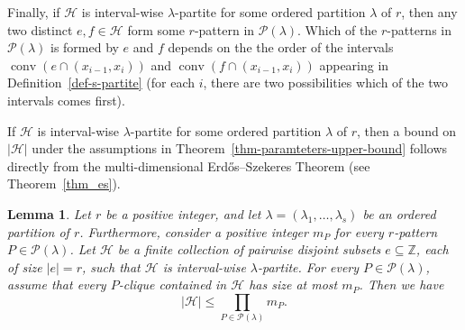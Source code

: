 \documentclass{aic}
\newtheorem{lemma}[theorem]{Lemma}
\theoremstyle{definition}
\numberwithin{equation}{section}
\numberwithin{figure}{section}
\newcommand{\su}{\subseteq}
\newcommand{\Z}{\mathbb{Z}}
\newcommand{\HH}{\mathcal{H}}
\newcommand{\conv}{\operatorname{conv}}
\newcommand{\PP}{\mathcal{P}}
\begin{document}
Finally, if $\HH$ is interval-wise $\lambda$-partite for some ordered partition $\lambda$ of $r$, then any two distinct $e,f\in\HH$ form some $r$-pattern in $\PP(\lambda)$. Which of the $r$-patterns in $\PP(\lambda)$ is formed by $e$ and $f$ depends on the the order of the intervals $\conv(e\cap (x_{i-1},x_i))$ and $\conv(f\cap (x_{i-1},x_i))$ appearing in Definition~\ref{def-s-partite} (for each $i$, there are two possibilities which of the two intervals comes first).

If $\HH$ is interval-wise $\lambda$-partite for some ordered partition $\lambda$ of $r$, then a bound on $|\HH|$ under the assumptions in Theorem~\ref{thm-paramteters-upper-bound} follows directly from the multi-dimensional Erd\H{o}s--Szekeres Theorem (see Theorem~\ref{thm_es}). 

\begin{lemma}\label{obs-interval-wise}
Let $r$ be a positive integer, and let $\lambda=(\lambda_1,\dots,\lambda_s)$ be an ordered partition of $r$. Furthermore, consider a positive integer $m_P$ for every $r$-pattern $P\in \PP(\lambda)$. Let $\HH$ be a finite collection of pairwise disjoint subsets $e\su \Z$, each of size $|e|=r$, such that $\HH$ is interval-wise $\lambda$-partite. For every $P\in \PP(\lambda)$, assume that every $P$-clique contained in $\HH$ has size at most $m_{P}$. Then we have
\[|\HH|\le \prod_{P\in \PP(\lambda)} m_{P}.\]
\end{lemma}
\end{document}
